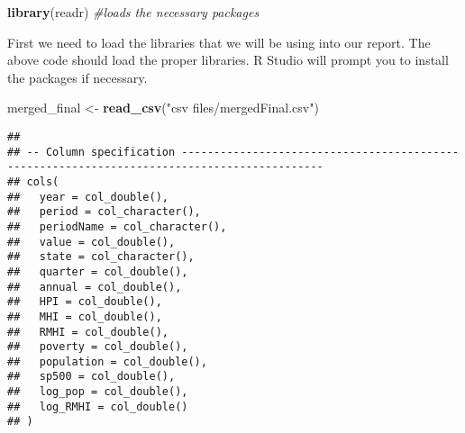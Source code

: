 \documentclass[
]{article}
\newenvironment{Shaded}{\begin{snugshade}}{\end{snugshade}}
\newcommand{\CommentTok}[1]{\textcolor[rgb]{0.56,0.35,0.01}{\textit{#1}}}
\newcommand{\DecValTok}[1]{\textcolor[rgb]{0.00,0.00,0.81}{#1}}
\newcommand{\KeywordTok}[1]{\textcolor[rgb]{0.13,0.29,0.53}{\textbf{#1}}}
\newcommand{\NormalTok}[1]{#1}
\newcommand{\OperatorTok}[1]{\textcolor[rgb]{0.81,0.36,0.00}{\textbf{#1}}}
\newcommand{\StringTok}[1]{\textcolor[rgb]{0.31,0.60,0.02}{#1}}
\begin{document}
\begin{Shaded}
\begin{Highlighting}[]
\KeywordTok{library}\NormalTok{(readr)}
\CommentTok{#loads the necessary packages}
\end{Highlighting}
\end{Shaded}

First we need to load the libraries that we will be using into our
report. The above code should load the proper libraries. R Studio will
prompt you to install the packages if necessary.

\begin{Shaded}
\begin{Highlighting}[]
\NormalTok{merged_final <-}\StringTok{ }\KeywordTok{read_csv}\NormalTok{(}\StringTok{"csv files/mergedFinal.csv"}\NormalTok{)}
\end{Highlighting}
\end{Shaded}

\begin{verbatim}
## 
## -- Column specification --------------------------------------------------------------------------------------------
## cols(
##   year = col_double(),
##   period = col_character(),
##   periodName = col_character(),
##   value = col_double(),
##   state = col_character(),
##   quarter = col_double(),
##   annual = col_double(),
##   HPI = col_double(),
##   MHI = col_double(),
##   RMHI = col_double(),
##   poverty = col_double(),
##   population = col_double(),
##   sp500 = col_double(),
##   log_pop = col_double(),
##   log_RMHI = col_double()
## )
\end{verbatim}

\begin{Shaded}
\end{Shaded}
\end{document}
